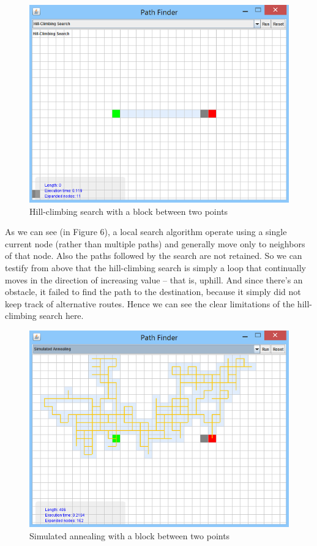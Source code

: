 \documentclass[a4paper]{article}
\begin{document}
\begin{figure}[h!]
  \centering
    \includegraphics[scale=.9]{images/hillclimb1.png}
  \caption{Hill-climbing search with a block between two points}
\end{figure}

\noindent As we can see (in Figure 6), a local search algorithm operate using a single current node (rather than multiple paths) and generally move only to neighbors of that node. Also the paths followed by the search are not retained. So we can testify from above that the hill-climbing search is simply a loop that continually moves in the direction of increasing value – that is, uphill. And since there’s an obstacle, it failed to find the path to the destination, because it simply did not keep track of alternative routes. Hence we can see the clear limitations of the hill-climbing search here. \\

\begin{figure}[h!]
  \centering
    \includegraphics[scale=.9]{images/sa1.png}
  \caption{Simulated annealing with a block between two points}
\end{figure}
\end{document}
